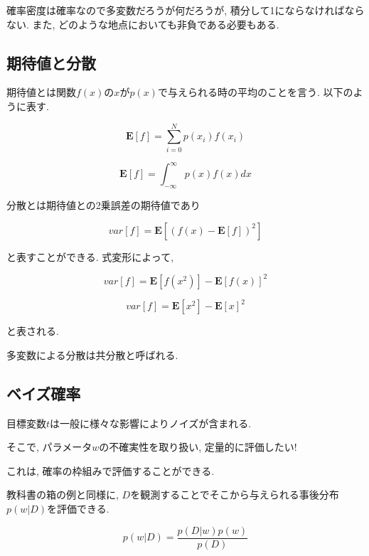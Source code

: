 

確率密度は確率なので多変数だろうが何だろうが, 積分して1にならなければならない.
また, どのような地点においても非負である必要もある.

\subsection{期待値と分散}

期待値とは関数$f(x)$の$x$が$p(x)$で与えられる時の平均のことを言う.
以下のように表す.

$$ \bm{E}[f] = \sum_{i=0}^{N}p(x_i)f(x_i) $$

$$ \bm{E}[f] = \int_{-\infty}^{\infty}p(x)f(x)dx $$

分散とは期待値との2乗誤差の期待値であり

$$ var[f] = \bm{E}[ (f(x) - \bm{E}[f])^2 ] $$

と表すことができる.
式変形によって,

$$ var[f] = \bm{E}[f(x^2)] - \bm{E}[f(x)]^2 $$

$$ var[f] = \bm{E}[x^2] - \bm{E}[x]^2 $$

と表される.

多変数による分散は共分散と呼ばれる.

\subsection{ベイズ確率}

目標変数$t$は一般に様々な影響によりノイズが含まれる. 

そこで, パラメータ$w$の不確実性を取り扱い, 定量的に評価したい!

これは, 確率の枠組みで評価することができる.

教科書の箱の例と同様に, $D$を観測することでそこから与えられる事後分布$p(w|D)$を評価できる.

$$ p(w|D) = \frac{p(D|w)p(w)}{p(D)} $$

